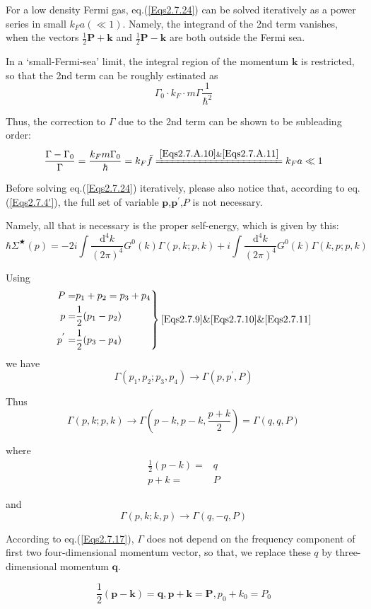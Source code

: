 For a low density Fermi gas, eq.(\ref{Eqs2.7.24}) can be solved iteratively as a power series in small $k_F a(\ll1)$. Namely, the integrand of the 2nd term vanishes, when the vectors $\frac{1}{2}\mathbf{P}+\mathbf{k}$ and $\frac{1}{2}\mathbf{P}-\mathbf{k}$ are both outside the Fermi sea.

In a `small-Fermi-sea' limit, the integral region of the momentum $\mathbf{k}$ is restricted, so that the 2nd term can be roughly estinated as
\[ \Gamma_0 \cdot k_F \cdot m \Gamma \frac{1}{\hbar^2} \]

Thus, the correction to $\Gamma$ due to the 2nd term can be shown to be subleading order:
\[ \frac{\Gamma-\Gamma_0}{\Gamma} = \frac{k_F m \Gamma_0}{\hbar} = k_F \tilde{f} \xlongequal{\ref{Eqs2.7.A.10} \& \ref{Eqs2.7.A.11}} k_F a \ll 1 \]

Before solving eq.(\ref{Eqs2.7.24}) iteratively, please also notice that, according to eq.(\ref{Eqs2.7.4'}), the full set of variable $\mathbf{p}$,$\mathbf{p}^{'}$,$P$ is not necessary.

Namely, all that is necessary is the proper self-energy, which is given by this:
\[ \hbar \Sigma^{\bigstar}(p) = -2 i \int \frac{\mathrm{d}^4 k}{(2\pi)^4} G^0(k)\Gamma(p,k;p,k) + i \int \frac{\mathrm{d}^4 k}{(2\pi)^4}G^0(k)\Gamma(k,p;p,k) \]

Using
\[ \left. \begin{split}
P =& p_1 + p_2 = p_3 + p_4\\
p =& \frac{1}{2}(p_1-p_2)\\
p^{'} =& \frac{1}{2}(p_3-p_4)
 \end{split} \right\} \ref{Eqs2.7.9} \& \ref{Eqs2.7.10} \& \ref{Eqs2.7.11} \]
we have
\[\Gamma(p_1,p_2;p_3,p_4) \rightarrow \Gamma(p,p^{'},P)\]

Thus
\[ \Gamma(p,k;p,k) \rightarrow \Gamma(p-k,p-k,\frac{p+k}{2}) = \Gamma(q,q,P) \]

where
\[ \begin{split} \frac{1}{2}(p-k) =& q\\ p+k =& P \end{split} \]

and
\[\Gamma(p,k;k,p) \rightarrow \Gamma(q,-q,P)\]

According to eq.(\ref{Eqs2.7.17}), $\Gamma$ does not depend on the frequency component of first two four-dimensional momentum vector, so that, we replace these $q$ by three-dimensional momentum $\mathbf{q}$.

\[\frac{1}{2}(\mathbf{p}-\mathbf{k})=\mathbf{q}, \mathbf{p}+\mathbf{k}=\mathbf{P},p_0+k_0=P_0
 \]

